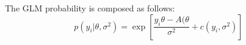 The GLM probability is composed as follows:
\begin{equation}
    p(y_i| \theta, \sigma^2) = 
    \exp{\left[ \frac{y_i\theta - A(\theta}{\sigma^2} + c(y_i,\sigma^2) \right] }
\end{equation}


%
%







%
